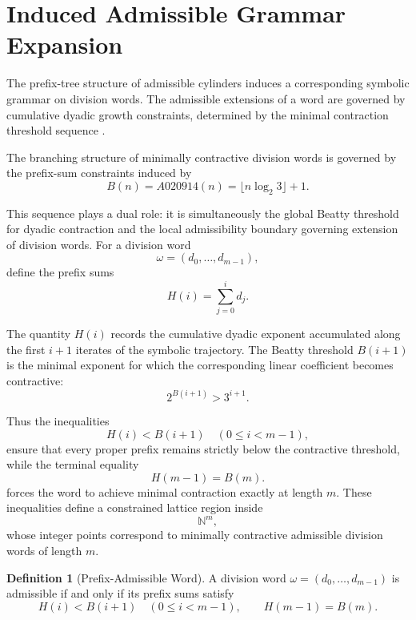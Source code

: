 \documentclass[12pt, oneside]{article}
\numberwithin{equation}{section}
\theoremstyle{definition}
\newtheorem{definition}{Definition}[section]
\theoremstyle{plain}
\theoremstyle{remark}
\begin{document}


\section{Induced Admissible Grammar Expansion}
\label{sec:induced-grammar-expansion}

The prefix-tree structure of admissible cylinders induces a corresponding
symbolic grammar on division words. The admissible extensions of a word
are governed by cumulative dyadic growth constraints, determined by the
minimal contraction threshold sequence .

The branching structure of minimally contractive division words is governed
by the prefix-sum constraints induced by
\[
B(n)=A020914(n)=\lfloor n\log_2 3\rfloor+1.
\]

This sequence plays a dual role: it is simultaneously the global Beatty
threshold for dyadic contraction and the local admissibility boundary
governing extension of division words.  For a division word
\[
\omega=(d_0,\dots,d_{m-1}),
\]
define the prefix sums
\[
H(i)=\sum_{j=0}^{i} d_j.
\]

The quantity \(H(i)\) records the cumulative dyadic exponent accumulated
along the first \(i+1\) iterates of the symbolic trajectory. The Beatty
threshold \(B(i+1)\) is the minimal exponent for which the corresponding
linear coefficient becomes contractive:
\[
2^{B(i+1)}>3^{i+1}.
\]

Thus the inequalities
\[
H(i)<B(i+1)
\quad (0\le i<m-1),
\]
ensure that every proper prefix remains strictly below the contractive
threshold, while the terminal equality
\[
H(m-1)=B(m).
\]
forces the word to achieve minimal contraction exactly at length \(m\).
These inequalities define a constrained lattice region inside
\[
\mathbb{N}^m,
\]
whose integer points correspond to minimally contractive admissible
division words of length \(m\).

\begin{definition}[Prefix-Admissible Word]
A division word $\omega=(d_0,\dots,d_{m-1})$ is admissible if and only if
its prefix sums satisfy
\[
H(i) < B(i+1) \quad (0 \le i < m-1),
\qquad
H(m-1)=B(m).
\]
\end{definition}

\end{document}
